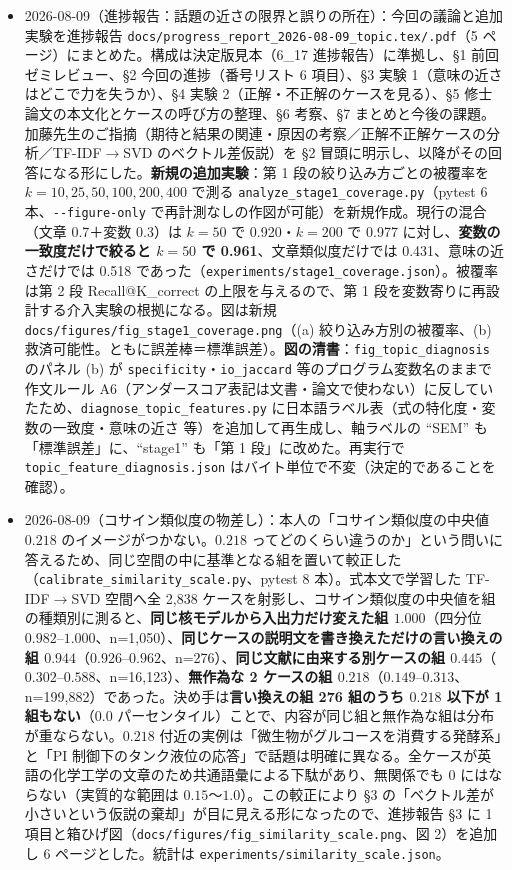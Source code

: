 \documentclass[11pt,a4paper]{jsarticle}
\begin{document}
\begin{itemize}[nosep]
  \item 2026-08-09（進捗報告：話題の近さの限界と誤りの所在）：今回の議論と追加実験を進捗報告 \texttt{docs/progress\_report\_2026-08-09\_topic.tex/.pdf}（5 ページ）にまとめた。構成は決定版見本（6\_17 進捗報告）に準拠し、\S1 前回ゼミレビュー、\S2 今回の進捗（番号リスト 6 項目）、\S3 実験 1（意味の近さはどこで力を失うか）、\S4 実験 2（正解・不正解のケースを見る）、\S5 修士論文の本文化とケースの呼び方の整理、\S6 考察、\S7 まとめと今後の課題。加藤先生のご指摘（期待と結果の関連・原因の考察／正解不正解ケースの分析／TF-IDF$\to$SVD のベクトル差仮説）を \S2 冒頭に明示し、以降がその回答になる形にした。\textbf{新規の追加実験}：第 1 段の絞り込み方ごとの被覆率を $k=10,25,50,100,200,400$ で測る \texttt{analyze\_stage1\_coverage.py}（pytest 6 本、\texttt{-{}-figure-only} で再計測なしの作図が可能）を新規作成。現行の混合（文章 0.7＋変数 0.3）は $k=50$ で 0.920・$k=200$ で 0.977 に対し、\textbf{変数の一致度だけで絞ると $k=50$ で 0.961}、文章類似度だけでは 0.431、意味の近さだけでは 0.518 であった（\texttt{experiments/stage1\_coverage.json}）。被覆率は第 2 段 Recall@K\_correct の上限を与えるので、第 1 段を変数寄りに再設計する介入実験の根拠になる。図は新規 \texttt{docs/figures/fig\_stage1\_coverage.png}（(a) 絞り込み方別の被覆率、(b) 救済可能性。ともに誤差棒＝標準誤差）。\textbf{図の清書}：\texttt{fig\_topic\_diagnosis} のパネル (b) が \texttt{specificity}・\texttt{io\_jaccard} 等のプログラム変数名のままで作文ルール A6（アンダースコア表記は文書・論文で使わない）に反していたため、\texttt{diagnose\_topic\_features.py} に日本語ラベル表（式の特化度・変数の一致度・意味の近さ 等）を追加して再生成し、軸ラベルの ``SEM'' も「標準誤差」に、``stage1'' も「第 1 段」に改めた。再実行で \texttt{topic\_feature\_diagnosis.json} はバイト単位で不変（決定的であることを確認）。
  \item 2026-08-09（コサイン類似度の物差し）：本人の「コサイン類似度の中央値 $0.218$ のイメージがつかない。$0.218$ ってどのくらい違うのか」という問いに答えるため、同じ空間の中に基準となる組を置いて較正した（\texttt{calibrate\_similarity\_scale.py}、pytest 8 本）。式本文で学習した TF-IDF$\to$SVD 空間へ全 2{,}838 ケースを射影し、コサイン類似度の中央値を組の種類別に測ると、\textbf{同じ核モデルから入出力だけ変えた組 $1.000$}（四分位 $0.982$–$1.000$、n=1{,}050）、\textbf{同じケースの説明文を書き換えただけの言い換えの組 $0.944$}（$0.926$–$0.962$、n=276）、\textbf{同じ文献に由来する別ケースの組 $0.445$}（$0.302$–$0.588$、n=16{,}123）、\textbf{無作為な 2 ケースの組 $0.218$}（$0.149$–$0.313$、n=199{,}882）であった。決め手は\textbf{言い換えの組 276 組のうち $0.218$ 以下が 1 組もない}（0.0 パーセンタイル）ことで、内容が同じ組と無作為な組は分布が重ならない。$0.218$ 付近の実例は「微生物がグルコースを消費する発酵系」と「PI 制御下のタンク液位の応答」で話題は明確に異なる。全ケースが英語の化学工学の文章のため共通語彙による下駄があり、無関係でも $0$ にはならない（実質的な範囲は $0.15$〜$1.0$）。この較正により \S3 の「ベクトル差が小さいという仮説の棄却」が目に見える形になったので、進捗報告 \S3 に 1 項目と箱ひげ図（\texttt{docs/figures/fig\_similarity\_scale.png}、図 2）を追加し 6 ページとした。統計は \texttt{experiments/similarity\_scale.json}。

\end{itemize}
\end{document}
